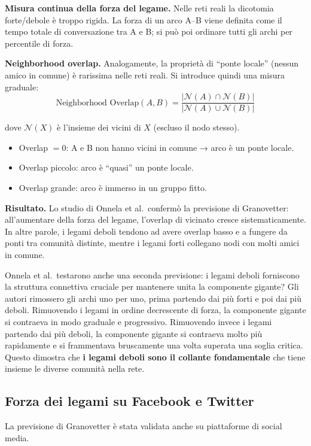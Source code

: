 \documentclass[12pt,a4paper]{article}
\newcommand{\formula}[1]{%
  \begin{equation*}#1\end{equation*}%
}
\begin{document}
\medskip
\noindent\textbf{Misura continua della forza del legame.}
Nelle reti reali la dicotomia forte/debole è troppo rigida. La forza di un arco A–B
viene definita come il tempo totale di conversazione tra A e B; si può poi ordinare
tutti gli archi per percentile di forza.

\medskip
\noindent\textbf{Neighborhood overlap.}
Analogamente, la proprietà di ``ponte locale'' (nessun amico in comune) è rarissima nelle
reti reali. Si introduce quindi una misura graduale:
\formula{
  \text{Neighborhood Overlap}(A,B) =
  \frac{|\mathcal{N}(A) \cap \mathcal{N}(B)|}{|\mathcal{N}(A) \cup \mathcal{N}(B)|}
}
dove $\mathcal{N}(X)$ è l'insieme dei vicini di $X$ (escluso il nodo stesso).
\begin{itemize}
  \item Overlap $= 0$: A e B non hanno vicini in comune → arco è un ponte locale.
  \item Overlap piccolo: arco è ``quasi'' un ponte locale.
  \item Overlap grande: arco è immerso in un gruppo fitto.
\end{itemize}

\noindent\textbf{Risultato.} Lo studio di Onnela et al.\ confermò la previsione di Granovetter:
all'aumentare della forza del legame, l'overlap di vicinato cresce sistematicamente. In
altre parole, i legami deboli tendono ad avere overlap basso e a fungere da ponti tra
comunità distinte, mentre i legami forti collegano nodi con molti amici in comune.

Onnela et al.\ testarono anche una seconda previsione: i legami deboli forniscono la
struttura connettiva cruciale per mantenere unita la componente gigante? Gli autori
rimossero gli archi uno per uno, prima partendo dai più forti e poi dai più deboli.
Rimuovendo i legami in ordine decrescente di forza, la componente gigante si contraeva
in modo graduale e progressivo. Rimuovendo invece i legami partendo dai più deboli,
la componente gigante si contraeva molto più rapidamente e si frammentava bruscamente
una volta superata una soglia critica. Questo dimostra che \textbf{i legami deboli sono
il collante fondamentale} che tiene insieme le diverse comunità nella rete.

\subsection{Forza dei legami su Facebook e Twitter}

La previsione di Granovetter è stata validata anche su piattaforme di social media.
\end{document}
